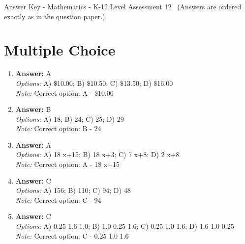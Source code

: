 \documentclass[12pt]{article}
\begin{document}
\begin{center}
Answer Key - Mathematics - K-12 Level Assessment 12 \
\small (Answers are ordered exactly as in the question paper.)
\end{center}

\section*{Multiple Choice}
\begin{enumerate}[label=\arabic*.]
\item \textbf{Answer:} A
\\ \textit{Options:} A) \$10.00; B) \$10.50; C) \$13.50; D) \$16.00
\\ \textit{Note:} Correct option: A - \$10.00
\item \textbf{Answer:} B
\\ \textit{Options:} A) 18; B) 24; C) 25; D) 29
\\ \textit{Note:} Correct option: B - 24
\item \textbf{Answer:} A
\\ \textit{Options:} A) 18 x+15; B) 18 x+3; C) 7 x+8; D) 2 x+8
\\ \textit{Note:} Correct option: A - 18 x+15
\item \textbf{Answer:} C
\\ \textit{Options:} A) 156; B) 110; C) 94; D) 48
\\ \textit{Note:} Correct option: C - 94
\item \textbf{Answer:} C
\\ \textit{Options:} A) 0.25 1.6 1.0; B) 1.0 0.25 1.6; C) 0.25 1.0 1.6; D) 1.6 1.0 0.25
\\ \textit{Note:} Correct option: C - 0.25 1.0 1.6
\end{enumerate}
\end{document}
